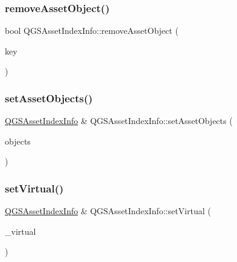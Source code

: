 \mbox{\label{class_q_g_s_asset_index_info_a293cbaa056c8d9d3e8e2a56bb09b1608}} 
\subsubsection{\texorpdfstring{remove\+Asset\+Object()}{removeAssetObject()}}
{\footnotesize\ttfamily bool Q\+G\+S\+Asset\+Index\+Info\+::remove\+Asset\+Object (\begin{DoxyParamCaption}\item[{const Q\+String \&}]{key }\end{DoxyParamCaption})}

\mbox{\label{class_q_g_s_asset_index_info_abc46db2536a782ac4d9a124101ae0aee}} 
\subsubsection{\texorpdfstring{set\+Asset\+Objects()}{setAssetObjects()}}
{\footnotesize\ttfamily \mbox{\hyperlink{class_q_g_s_asset_index_info}{Q\+G\+S\+Asset\+Index\+Info}} \& Q\+G\+S\+Asset\+Index\+Info\+::set\+Asset\+Objects (\begin{DoxyParamCaption}\item[{const Q\+Map$<$ Q\+String, \mbox{\hyperlink{class_q_g_s_asset_object}{Q\+G\+S\+Asset\+Object}} $>$ \&}]{objects }\end{DoxyParamCaption})}

\mbox{\label{class_q_g_s_asset_index_info_acd496b4b2aae04737335a6bdb9958938}} 
\subsubsection{\texorpdfstring{set\+Virtual()}{setVirtual()}}
{\footnotesize\ttfamily \mbox{\hyperlink{class_q_g_s_asset_index_info}{Q\+G\+S\+Asset\+Index\+Info}} \& Q\+G\+S\+Asset\+Index\+Info\+::set\+Virtual (\begin{DoxyParamCaption}\item[{const bool}]{\+\_\+virtual }\end{DoxyParamCaption})}

